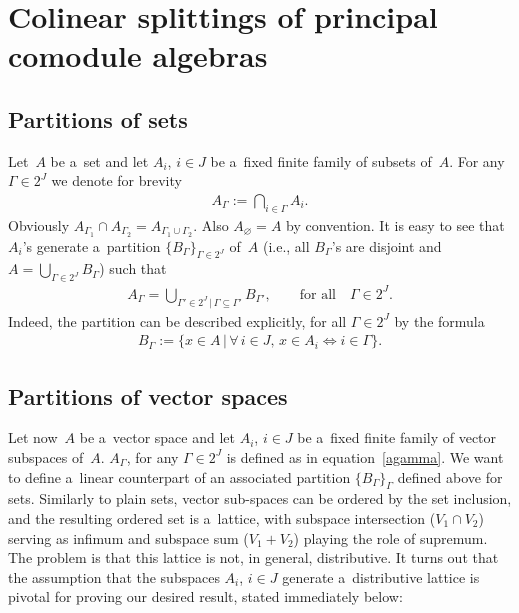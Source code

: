 \documentclass[pdftex]{sigma}
\begin{document}
\section{Colinear splittings of principal comodule algebras}\label{partitions-s}

\subsection{Partitions of sets}

Let~$A$ be a~set and let $A_i$, $i\in J$ be a~f\/ixed f\/inite family of subsets of~$A$.
For any $\Gamma\in 2^J$ we denote for brevity
\begin{gather}
\label{agamma}
A_\Gamma:=\bigcap_{i\in \Gamma}A_i.
\end{gather}
Obviously $A_{\Gamma_1}\cap A_{\Gamma_2}=A_{\Gamma_1\cup\Gamma_2}$.
Also $A_\varnothing = A$ by convention.
It is easy to see that $A_i$'s generate a~partition $\{B_\Gamma\}_{\Gamma\in 2^J}$ of~$A$ (i.e., all $B_\Gamma$'s are
disjoint and $A=\bigcup_{\Gamma\in2^J}B_\Gamma$) such that
\begin{gather*}
A_\Gamma=\bigcup_{\Gamma'\in2^J
\,| \,
\Gamma\subseteq\Gamma'}B_{\Gamma'},
\qquad
\text{for all}
\quad
\Gamma\in 2^J.
\end{gather*}
Indeed, the partition can be described explicitly, for all $\Gamma\in2^J$ by the formula
\begin{gather*}
B_\Gamma
:=\{x\in A
\,|\,
\forall\, i\in J,\,
x\in A_i\Leftrightarrow i\in \Gamma\}.
\end{gather*}

\subsection{Partitions of vector spaces}

Let now~$A$ be a~vector space and let $A_i$, $i\in J$ be a~f\/ixed f\/inite family of vector subspaces of~$A$.
$A_\Gamma$, for any $\Gamma\in 2^J$ is def\/ined as in equation~\eqref{agamma}.
We want to def\/ine a~linear counterpart of an associated partition $\{B_\Gamma\}_\Gamma$ def\/ined above for sets.
Similarly to plain sets, vector sub-spaces can be ordered by the set inclusion, and the resulting ordered set is
a~lattice, with subspace intersection ($V_1\cap V_2$) serving as inf\/imum and subspace sum ($V_1+V_2$) playing the role
of supremum.
The problem is that this lattice is not, in general, distributive.
It turns out that the assumption that the subspaces $A_i$, $i\in J$ generate a~distributive lattice is pivotal for
proving our desired result, stated immediately below:
\end{document}
